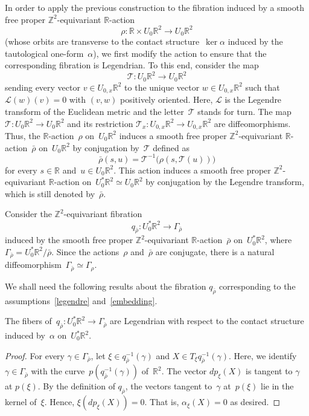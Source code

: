 \documentclass[AHL,Unicode,longabstracts,published]{cedram}
\newcommand{\Tau}{\mathcal{T}}
\newcommand{\LL}{\mathcal{L}}
\newcommand{\Z}{\mathbb{Z}}
\newcommand{\R}{\mathbb{R}}
\begin{document}
In order to apply the previous construction to the fibration induced by a smooth free proper $\Z^2$-equivariant $\R$-action
\[
\rho:\R \times U_0\R^2 \to U_0\R^2
\]
(whose orbits are transverse to the contact structure~$\ker \alpha$ induced by the tautological one-form~$\alpha$), we first modify the action to ensure that the corresponding fibration is Legendrian. To this end, consider the map
\[
\Tau:U_0 \R^2 \to U_0 \R^2
\]
sending every vector $v \in U_{0,x} \R^2$ to the unique vector $w \in U_{0,x} \R^2$ such that \mbox{$\LL(w)(v)=0$} with $(v,w)$ positively oriented. Here, $\LL$ is the Legendre transform of the Euclidean metric and the letter~$\Tau$ stands for turn. The map $\Tau:U_0\R^2 \to U_0\R^2$ and its restriction $\Tau_x:U_{0,x} \R^2 \to U_{0,x} \R^2$ are diffeomorphisms. Thus, the $\R$-action~$\rho$ on~$U_0\R^2$ induces a smooth free proper $\Z^2$-equivariant $\R$-action~$\bar{\rho}$ on~$U_0 \R^2$ by conjugation by~$\Tau$ defined as
\[
\bar{\rho}(s,u) = \Tau^{-1}\big(\rho(s,\Tau(u))\big)
\]
for every $s \in \R$ and~$u \in U_0\R^2$. This action induces a smooth free proper $\Z^2$-equivariant $\R$-action on~$U_0^* \R^2 \simeq U_0 \R^2$ by conjugation by the Legendre transform, which is still denoted by~$\bar{\rho}$.

Consider the $\Z^2$-equivariant fibration
\[
q_{\bar{\rho}}:U_0^* \R^2 \to \Gamma_{\bar{\rho}}
\]
induced by the smooth free proper $\Z^2$-equivariant $\R$-action~$\bar{\rho}$ on~$U_0^* \R^2$, where $\Gamma_{\bar{\rho}} = U_0^* \R^2 / \bar{\rho}$. Since the actions~$\rho$ and~$\bar{\rho}$ are conjugate, there is a natural diffeomorphism~$\Gamma_{\bar{\rho}} \simeq \Gamma_\rho$.

We shall need the following results about the fibration $q_{\bar{\rho}}$ corresponding to the assumptions~\eqref{legendre} and~\eqref{embedding}.

\begin{lemm}
The fibers of~$q_{\bar{\rho}}:U_0^{*}\R^{2} \rightarrow \Gamma_{\bar{\rho}}$ are Legendrian with respect to the contact structure induced by~$\alpha$ on~$U_0^{*}\R^{2}$.
\end{lemm}

\begin{proof}
For every $\gamma\in\Gamma_{\bar{\rho}}$, let $\xi\in q_{\bar{\rho}}^{-1}(\gamma)$ and $X\in T_{\xi} q_{\bar{\rho}}^{-1}(\gamma)$. Here, we identify $\gamma \in \Gamma_{\bar{\rho}}$ with the curve~$p(q_{\bar{\rho}}^{-1}(\gamma))$ of~$\R^2$. The vector $dp_{\xi}(X)$ is tangent to $\gamma$ at $p(\xi)$. By the definition of $q_{\bar{\rho}}$, the vectors tangent to~$\gamma$ at~$p(\xi)$ lie in the kernel of~$\xi$. Hence, $\xi(dp_{\xi}(X))=0$. That is, $\alpha_{\xi}(X)=0$ as desired.
\end{proof}
\end{document}
